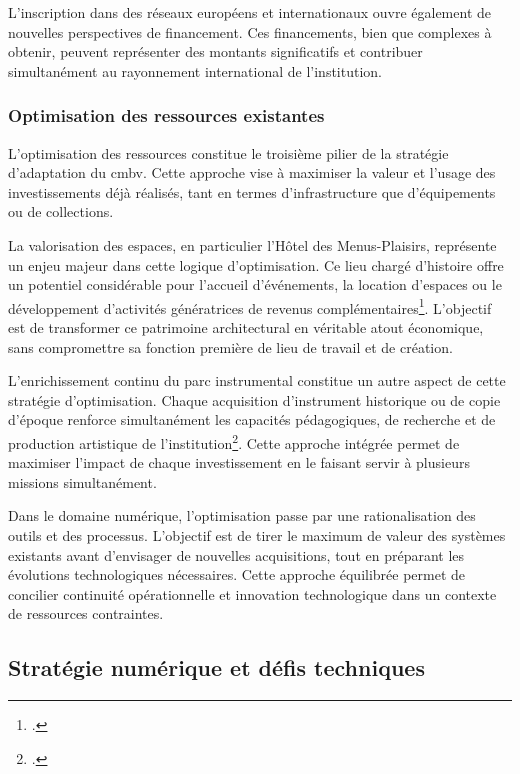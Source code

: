 L'inscription dans des réseaux européens et internationaux ouvre également de nouvelles perspectives de financement. Ces financements, bien que complexes à obtenir, peuvent représenter des montants significatifs et contribuer simultanément au rayonnement international de l'institution.

\subsubsection{Optimisation des ressources existantes}

L'optimisation des ressources constitue le troisième pilier de la stratégie d'adaptation du \gls{cmbv}. Cette approche vise à maximiser la valeur et l'usage des investissements déjà réalisés, tant en termes d'infrastructure que d'équipements ou de collections.

La valorisation des espaces, en particulier l'Hôtel des Menus-Plaisirs, représente un enjeu majeur dans cette logique d'optimisation. Ce lieu chargé d'histoire offre un potentiel considérable pour l'accueil d'événements, la location d'espaces ou le développement d'activités génératrices de revenus complémentaires\footcite{centredemusiquebaroquedeversaillesProjetEtablissement2022}. L'objectif est de transformer ce patrimoine architectural en véritable atout économique, sans compromettre sa fonction première de lieu de travail et de création.

L'enrichissement continu du parc instrumental constitue un autre aspect de cette stratégie d'optimisation. Chaque acquisition d'instrument historique ou de copie d'époque renforce simultanément les capacités pédagogiques, de recherche et de production artistique de l'institution\footcite{centredemusiquebaroquedeversaillesProjetEtablissement2022}. Cette approche intégrée permet de maximiser l'impact de chaque investissement en le faisant servir à plusieurs missions simultanément.

Dans le domaine numérique, l'optimisation passe par une rationalisation des outils et des processus. L'objectif est de tirer le maximum de valeur des systèmes existants avant d'envisager de nouvelles acquisitions, tout en préparant les évolutions technologiques nécessaires. Cette approche équilibrée permet de concilier continuité opérationnelle et innovation technologique dans un contexte de ressources contraintes.

\subsection{Stratégie numérique et défis techniques}

